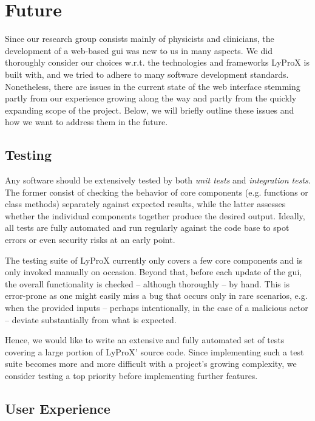 \documentclass[\relativeRoot/main.tex]{subfiles}
\begin{document}
\section{Future}
\label{sec:lyprox:future}

Since our research group consists mainly of physicists and clinicians, the development of a web-based \gls{gui} was new to us in many aspects. We did thoroughly consider our choices w.r.t. the technologies and frameworks LyProX is built with, and we tried to adhere to many software development standards. Nonetheless, there are issues in the current state of the web interface stemming partly from our experience growing along the way and partly from the quickly expanding scope of the project. Below, we will briefly outline these issues and how we want to address them in the future.

\subsection*{Testing}

Any software should be extensively tested by both \emph{unit tests} and \emph{integration tests}. The former consist of checking the behavior of core components (e.g. functions or class methods) separately against expected results, while the latter assesses whether the individual components together produce the desired output. Ideally, all tests are fully automated and run regularly against the code base to spot errors or even security risks at an early point.

The testing suite of LyProX currently only covers a few core components and is only invoked manually on occasion. Beyond that, before each update of the \gls{gui}, the overall functionality is checked -- although thoroughly -- by hand. This is error-prone as one might easily miss a bug that occurs only in rare scenarios, e.g. when the provided inputs -- perhaps intentionally, in the case of a malicious actor -- deviate substantially from what is expected.

Hence, we would like to write an extensive and fully automated set of tests covering a large portion of LyProX' source code. Since implementing such a test suite becomes more and more difficult with a project's growing complexity, we consider testing a top priority before implementing further features.

\subsection*{User Experience}
\end{document}
